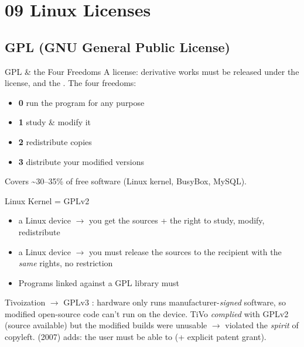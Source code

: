 \section{09 Linux Licenses}

\subsection{GPL (GNU General Public License)}

\begin{concept}{GPL \& the Four Freedoms}
    A  license: derivative works must be released under the
     license, and the .
    The four freedoms:
    \begin{itemize}
        \item \textbf{0} run the program for any purpose
        \item \textbf{1} study \& modify it
        \item \textbf{2} redistribute copies
        \item \textbf{3} distribute your modified versions
    \end{itemize}
    Covers \textasciitilde30--35\% of free software (Linux kernel, BusyBox, MySQL).
\end{concept}

\begin{definition}{Linux Kernel = GPLv2}
    \begin{itemize}
        \item {} a Linux device $\to$ you get the sources +
              the right to study, modify, redistribute
        \item {} a Linux device $\to$ you must release the sources
              to the recipient with the \emph{same} rights, no restriction
        \item Programs linked against a GPL library must 
    \end{itemize}
\end{definition}

\begin{corollary}{Tivoization $\to$ GPLv3}
    : hardware only runs manufacturer-\emph{signed} software,
    so modified open-source code can't run on the device. TiVo \emph{complied} with
    GPLv2 (source available) but the modified builds were unusable $\to$ violated the
    \emph{spirit} of copyleft.  (2007) adds: the user must be able to
     (+ explicit patent grant).
\end{corollary}

